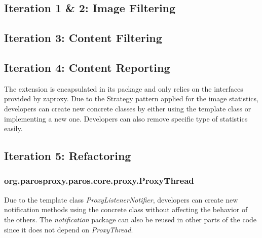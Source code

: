 \subsection{Iteration 1 \& 2: Image Filtering}
\subsection{Iteration 3: Content Filtering}
\subsection{Iteration 4: Content Reporting}
The extension is encapsulated in its package and only relies on the interfaces provided by zaproxy. Due to the Strategy pattern applied for the image statistics, developers can create new concrete classes by either using the template class or implementing a new one. Developers can also remove specific type of statistics easily.

\subsection{Iteration 5: Refactoring}

\subsubsection{org.parosproxy.paros.core.proxy.ProxyThread}

Due to the template class \textit{ProxyListenerNotifier}, developers can create new notification methods using the concrete class without affecting the behavior of the others. The \textit{notification} package can also be reused in other parts of the code since it does not depend on \textit{ProxyThread}. 
